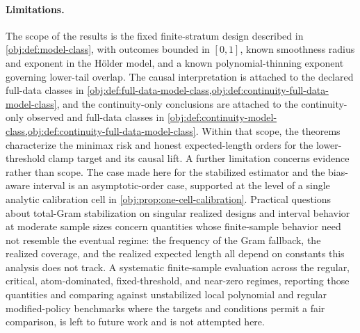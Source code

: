\paragraph{Limitations.}
The scope of the results is the fixed finite-stratum design described in \cref{obj:def:model-class}, with outcomes bounded in \([0,1]\), known smoothness radius and exponent in the Hölder model, and a known polynomial-thinning exponent governing lower-tail overlap. The causal interpretation is attached to the declared full-data classes in \cref{obj:def:full-data-model-class,obj:def:continuity-full-data-model-class}, and the continuity-only conclusions are attached to the continuity-only observed and full-data classes in \cref{obj:def:continuity-model-class,obj:def:continuity-full-data-model-class}. Within that scope, the theorems characterize the minimax risk and honest expected-length orders for the lower-threshold clamp target and its causal lift. A further limitation concerns evidence rather than scope. The case made here for the stabilized estimator and the bias-aware interval is an asymptotic-order case, supported at the level of a single analytic calibration cell in \cref{obj:prop:one-cell-calibration}. Practical questions about total-Gram stabilization on singular realized designs and interval behavior at moderate sample sizes concern quantities whose finite-sample behavior need not resemble the eventual regime: the frequency of the Gram fallback, the realized coverage, and the realized expected length all depend on constants this analysis does not track. A systematic finite-sample evaluation across the regular, critical, atom-dominated, fixed-threshold, and near-zero regimes, reporting those quantities and comparing against unstabilized local polynomial and regular modified-policy benchmarks where the targets and conditions permit a fair comparison, is left to future work and is not attempted here.

